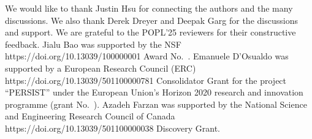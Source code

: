 \begin{acks}
  We would like to thank Justin Hsu
  for connecting the authors and the many discussions.
  We also thank Derek Dreyer and Deepak Garg for the
  discussions and support.
  We are grateful to the POPL'25 reviewers for
  their constructive feedback.
  Jialu Bao was supported by the
    {NSF}
    {https://doi.org/10.13039/100000001}
  Award No.~.
  Emanuele D'Osualdo was supported by a
    {European Research Council (ERC)}
    {https://doi.org/10.13039/501100000781}
  Consolidator Grant for the project ``PERSIST'' under the European Union's Horizon 2020 research and innovation programme
  (grant No.~).
Azadeh Farzan was supported by the
    {National Science and Engineering Research Council of Canada}
    {https://doi.org/10.13039/501100000038}
  Discovery Grant.
\end{acks}
